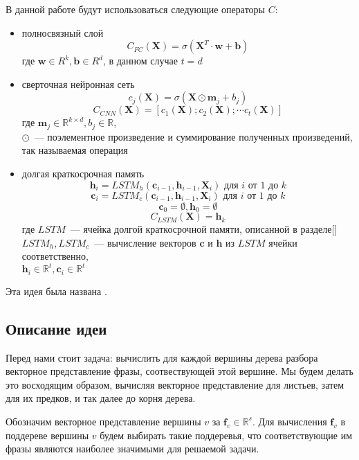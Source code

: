 \vspace{5mm}

\noindent В данной работе будут использоваться следующие операторы $C$:
\begin{itemize}
    \item{полносвязный слой}
        $$C_{FC}(\pmb{X})=\sigma(\pmb{X}^T \cdot \pmb{w} + \pmb{b})$$
        где $\pmb{w} \in R^k, \pmb{b} \in R^d$, в данном случае $t=d$
    \item{сверточная нейронная сеть}
        $$c_j(\pmb{X})=\sigma(\pmb{X} \odot \pmb{m}_j + b_j)$$
        $$C_{CNN}(\pmb{X})=[c_1(\pmb{X}); c_2(\pmb{X}); \cdots c_t(\pmb{X})]$$
        где $\pmb{m}_j \in \mathbb{R}^{k \times d}, b_j \in \mathbb{R}$,\\
        $\odot$~--- поэлементное произведение и суммирование полученных произведений, 
        так называемая операция 
    \item{долгая краткосрочная память}
    $$\pmb{h}_i=LSTM_h(\pmb{c}_{i-1}, \pmb{h}_{i-1}, \pmb{X}_i) \text{ для } i \text{ от } 1 \text { до } k$$  
    $$\pmb{c}_i=LSTM_c(\pmb{c}_{i-1}, \pmb{h}_{i-1}, \pmb{X}_i) \text{ для } i \text{ от } 1 \text { до } k$$ 
    $$\pmb{c}_0 = \emptyset, \pmb{h}_0 = \emptyset$$
    $$C_{LSTM}(\pmb{X}) = \pmb{h}_k$$
    где $LSTM$~--- ячейка долгой краткосрочной памяти, описанной в разделе[]\\
    $LSTM_h, LSTM_c$~--- вычисление векторов $\pmb{c}$ и $\pmb{h}$ из $LSTM$ ячейки соответственно,\\
    $\pmb{h}_i \in \mathbb{R}^t, \pmb{c}_i \in \mathbb{R}^t$
\end{itemize}

\noindent Эта идея была названа .

\subsection{Описание идеи } 

Перед нами стоит задача: вычислить для каждой вершины дерева разбора 
векторное представление фразы, соотвествующей этой вершине.
Мы будем делать это восходящим образом, вычисляя векторное представление для листьев,
затем для их предков, и так далее до корня дерева.

Обозначим векторное представление вершины $v$ за $\pmb{f}_v \in \mathbb{R}^s$.
Для вычисления $\pmb{f}_v$ в поддереве вершины $v$ будем выбирать такие поддеревья, 
что соответствующие им фразы являются наиболее значимыми для решаемой задачи.

